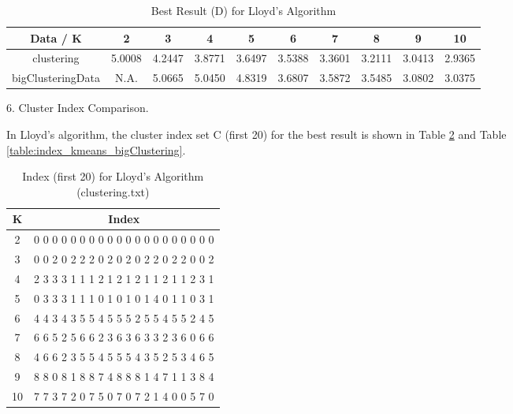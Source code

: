\begin{description}
\begin{description}
\begin{table}[H]
	\centering
	\caption{Best Result (D) for Lloyd's Algorithm}
	\label{table:best_kmeans}	
	\begin{tabular}{ c | c | c | c | c | c | c | c | c | c}
		\hline \hline
		Data / K      &  2        &     3    & 4    & 5     & 6    & 7    & 8   & 9    & 10 \\[0.1cm]
		\hline
	clustering	        & 5.0008 & 4.2447 & 3.8771 & 3.6497 & 3.5388 & 3.3601 & 3.2111 & 3.0413 & 2.9365 \\[0.1cm]
bigClusteringData & N.A.    & 5.0665 & 5.0450 & 4.8319 & 3.6807 & 3.5872 & 3.5485 & 3.0802 & 3.0375 \\[0.1cm]
		\hline	
	\end{tabular}
\end{table}

\item{6.} Cluster Index Comparison.

In Lloyd's algorithm, the cluster index set C (first 20) for the best result is shown in Table \ref{table:index_kmeans_clustering} and Table \ref{table:index_kmeans_bigClustering}.

\begin{table}[H]
	\centering
	\caption{Index (first 20) for Lloyd's Algorithm (clustering.txt)}
	\label{table:index_kmeans_clustering}	
	\begin{tabular}{ c | c }
		\hline \hline
		K        &    Index  \\[0.1cm]
		\hline
		2     &  0  0  0  0  0  0  0  0  0  0  0  0  0  0  0  0  0  0  0  0 \\[0.1cm]
		3     &  0  0  2  0  2  2  2  0  2  0  2  0  2  2  0  2  2  0  0  2 \\[0.1cm]
		4     &  2  3  3  3  1  1  1  2  1  2  1  2  1  1  2  1  1  2  3  1 \\[0.1cm]
		5     &  0  3  3  3  1  1  1  0  1  0  1  0  1  4  0  1  1  0  3  1 \\[0.1cm]
		6     &  4  4  3  4  3  5  5  4  5  5  5  2  5  5  4  5  5  2  4  5 \\[0.1cm]
		7     &  6  6  5  2  5  6  6  2  3  6  3  6  3  3  2  3  6  0  6  6 \\[0.1cm]
		8     &  4  6  6  2  3  5  5  4  5  5  5  4  3  5  2  5  3  4  6  5 \\[0.1cm]
		9     &  8  8  0  8  1  8  8  7  4  8  8  8  1  4  7  1  1  3  8  4 \\[0.1cm]
		10   &  7  7  3  7  2  0  7  5  0  7  0  7  2  1  4  0  0  5  7  0 \\[0.1cm]
		\hline	
	\end{tabular}
\end{table}


\end{description}
\end{description}

